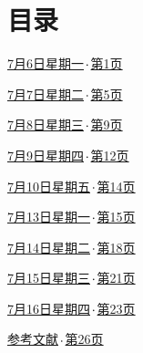\documentclass[12pt, oneside, a4paper]{ctexart}
\begin{document}
\section*{目录}
\vspace{4mm}
\newcommand{\diarytocdots}{\nobreak\leaders\hbox{\(\mkern1.5mu\cdot\mkern1.5mu\)}\hfill\nobreak}
{\diaryJournalBodyFont
  \noindent\hyperlink{journal-day-0706}{\diaryHei 7月6日}\quad{}\hyperlink{journal-day-0706}{\diaryHei 星期一}\diarytocdots\hyperlink{journal-day-0706}{第1页}\par\vspace{3mm}
  \noindent\hyperlink{journal-day-0707}{\diaryHei 7月7日}\quad{}\hyperlink{journal-day-0707}{\diaryHei 星期二}\diarytocdots\hyperlink{journal-day-0707}{第5页}\par\vspace{3mm}
  \noindent\hyperlink{journal-day-0708}{\diaryHei 7月8日}\quad{}\hyperlink{journal-day-0708}{\diaryHei 星期三}\diarytocdots\hyperlink{journal-day-0708}{第9页}\par\vspace{3mm}
  \noindent\hyperlink{journal-day-0709}{\diaryHei 7月9日}\quad{}\hyperlink{journal-day-0709}{\diaryHei 星期四}\diarytocdots\hyperlink{journal-day-0709}{第12页}\par\vspace{3mm}
  \noindent\hyperlink{journal-day-0710}{\diaryHei 7月10日}\quad{}\hyperlink{journal-day-0710}{\diaryHei 星期五}\diarytocdots\hyperlink{journal-day-0710}{第14页}\par\vspace{3mm}
  \noindent\hyperlink{journal-day-0713}{\diaryHei 7月13日}\quad{}\hyperlink{journal-day-0713}{\diaryHei 星期一}\diarytocdots\hyperlink{journal-day-0713}{第15页}\par\vspace{3mm}
  \noindent\hyperlink{journal-day-0714}{\diaryHei 7月14日}\quad{}\hyperlink{journal-day-0714}{\diaryHei 星期二}\diarytocdots\hyperlink{journal-day-0714}{第18页}\par\vspace{3mm}
  \noindent\hyperlink{journal-day-0715}{\diaryHei 7月15日}\quad{}\hyperlink{journal-day-0715}{\diaryHei 星期三}\diarytocdots\hyperlink{journal-day-0715}{第21页}\par\vspace{3mm}
  \noindent\hyperlink{journal-day-0716}{\diaryHei 7月16日}\quad{}\hyperlink{journal-day-0716}{\diaryHei 星期四}\diarytocdots\hyperlink{journal-day-0716}{第23页}\par\vspace{3mm}
  \noindent\hyperlink{references}{\diaryHei 参考文献}\diarytocdots\hyperlink{references}{第26页}\par}
\end{document}
